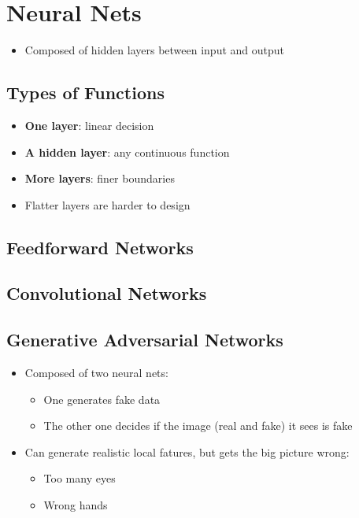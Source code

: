 \section{Neural Nets}

  \begin{itemize}
    \item Composed of hidden layers between input and output
  \end{itemize}

  \subsection{Types of Functions}

    \begin{itemize}
      \item \textbf{One layer}: linear decision
      \item \textbf{A hidden layer}: any continuous function
      \item \textbf{More layers}: finer boundaries
      \item Flatter layers are harder to design
    \end{itemize}

  \subsection{Feedforward Networks}

  \subsection{Convolutional Networks}

  \subsection{Generative Adversarial Networks}

    \begin{itemize}
      \item Composed of two neural nets:
      \begin{itemize}
        \item One generates fake data
        \item The other one decides if the image (real and fake) it sees is fake
      \end{itemize}

      \item Can generate realistic local fatures, but gets the big picture
      wrong:
      \begin{itemize}
        \item Too many eyes
        \item Wrong hands
      \end{itemize}
    \end{itemize}

